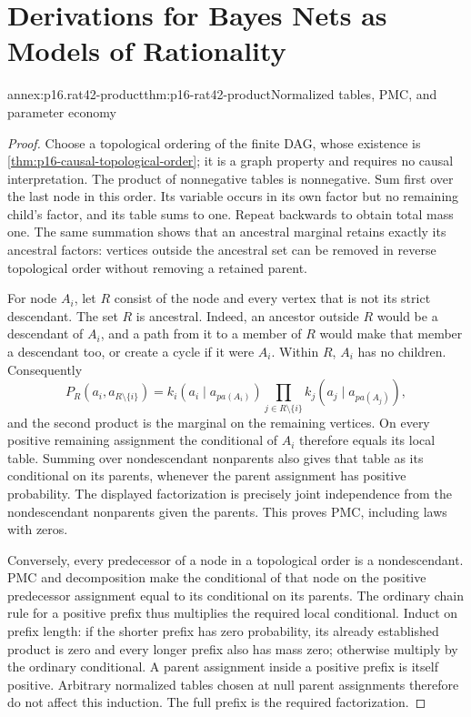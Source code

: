 \chapter{Derivations for Bayes Nets as Models of Rationality}
\label{annex:p16-rationality-4-2}

\begin{annexitem}{annex:p16.rat42-product}{thm:p16-rat42-product}{Normalized tables, PMC, and parameter economy}
\begin{proof}
Choose a topological ordering of the finite DAG, whose existence is
\cref{thm:p16-causal-topological-order}; it is a graph property and
requires no causal interpretation. The product of nonnegative tables
is nonnegative. Sum first over the last node in this order. Its variable
occurs in its own factor but no remaining child's factor, and its table
sums to one. Repeat backwards to obtain total mass one.
The same summation shows that an ancestral marginal retains exactly
its ancestral factors: vertices outside the ancestral set can be
removed in reverse topological order without removing a retained parent.

For node \(A_i\), let \(R\) consist of the node and every vertex that
is not its strict descendant. The set \(R\) is ancestral. Indeed,
an ancestor outside \(R\) would be a descendant of \(A_i\), and a
path from it to a member of \(R\) would make that member a descendant
too, or create a cycle if it were \(A_i\). Within \(R\), \(A_i\)
has no children. Consequently
\[
 P_R(a_i,a_{R\setminus\{i\}})
   =k_i(a_i\mid a_{pa(A_i)})
       \prod_{j\in R\setminus\{i\}}k_j(a_j\mid a_{pa(A_j)}),
\]
and the second product is the marginal on the remaining vertices.
On every positive remaining assignment the conditional of \(A_i\)
therefore equals its local table. Summing over nondescendant nonparents
also gives that table as its conditional on its parents, whenever the
parent assignment has positive probability. The displayed factorization
is precisely joint independence from the nondescendant nonparents
given the parents. This proves PMC, including laws with zeros.

Conversely, every predecessor of a node in a topological order is a
nondescendant. PMC and decomposition make the conditional of that
node on the positive predecessor assignment equal to its conditional
on its parents. The ordinary chain rule for a positive prefix thus
multiplies the required local conditional. Induct on prefix length:
if the shorter prefix has zero probability, its already established
product is zero and every longer prefix also has mass zero; otherwise
multiply by the ordinary conditional. A parent assignment inside a
positive prefix is itself positive. Arbitrary normalized tables chosen
at null parent assignments therefore do not affect this induction.
The full prefix is the required factorization.


\end{proof}
\end{annexitem}
